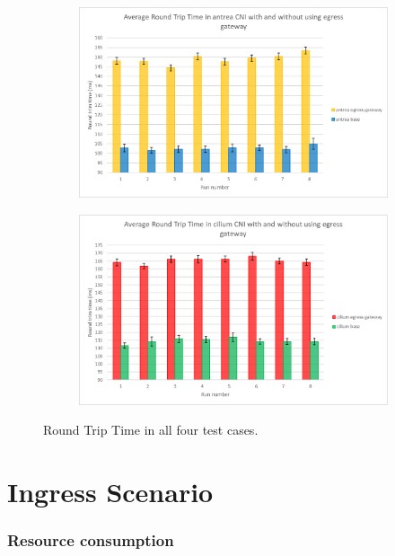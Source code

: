 \begin{figure}[H]
    \begin{subfigure}[b]{0.45\textwidth}
        \includegraphics[width=\textwidth]{plots/small/rtt_antrea.png}
        \caption{}
        \label{fig:rtt_c}
    \end{subfigure}
    \hfill
    \begin{subfigure}[b]{0.45\textwidth}
        \includegraphics[width=\textwidth]{plots/small/rtt_cilium.png}
        \caption{}
        \label{fig:rtt_d}
    \end{subfigure}
    
    \caption{Round Trip Time in all four test cases.}
    \label{fig:rttFour}
\end{figure}

\section{Ingress Scenario}
\label{sec:ingressComparison}

\subsubsection{Resource consumption}
\label{sec:ingressResoureComsumption}


